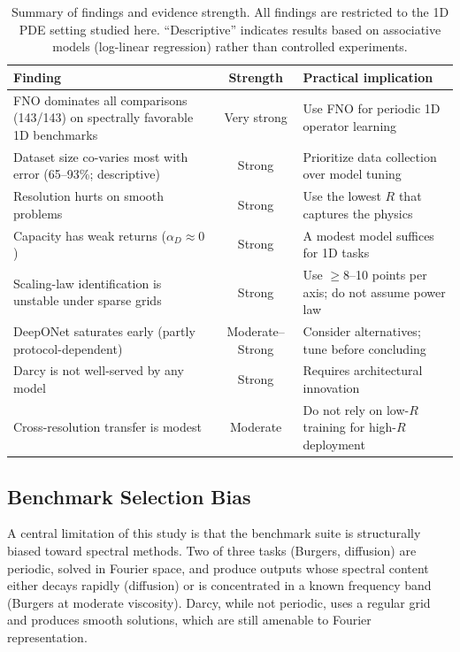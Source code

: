 \documentclass[11pt]{article}
\begin{document}
\begin{table}[h]
\centering
\caption{Summary of findings and evidence strength. All findings
are restricted to the 1D PDE setting studied here. ``Descriptive''
indicates results based on associative models (log-linear
regression) rather than controlled experiments.}
\label{tab:evidence}
\small
\begin{tabular}{@{}p{6.5cm}cp{5cm}@{}}
\toprule
\textbf{Finding} & \textbf{Strength} &
\textbf{Practical implication} \\
\midrule
FNO dominates all comparisons (143/143) on spectrally favorable 1D benchmarks &
Very strong &
Use FNO for periodic 1D operator learning \\
Dataset size co-varies most with error (65--93\%; descriptive) &
Strong &
Prioritize data collection over model tuning \\
Resolution hurts on smooth problems &
Strong &
Use the lowest $R$ that captures the physics \\
Capacity has weak returns ($\alpha_D \approx 0$) &
Strong &
A modest model suffices for 1D tasks \\
Scaling-law identification is unstable under sparse grids &
Strong &
Use $\geq$8--10 points per axis; do not assume power law \\
DeepONet saturates early (partly protocol-dependent) &
Moderate--Strong &
Consider alternatives; tune before concluding \\
Darcy is not well-served by any model &
Strong &
Requires architectural innovation \\
Cross-resolution transfer is modest &
Moderate &
Do not rely on low-$R$ training for high-$R$
deployment \\
\bottomrule
\end{tabular}
\end{table}

\subsection{Benchmark Selection Bias}
\label{sec:benchmark-bias}

A central limitation of this study is that the benchmark suite is
structurally biased toward spectral methods.
Two of three tasks (Burgers, diffusion) are periodic, solved in
Fourier space, and produce outputs whose spectral content either
decays rapidly (diffusion) or is concentrated in a known frequency
band (Burgers at moderate viscosity).
Darcy, while not periodic, uses a regular grid and produces smooth
solutions, which are still amenable to Fourier representation.
\end{document}
